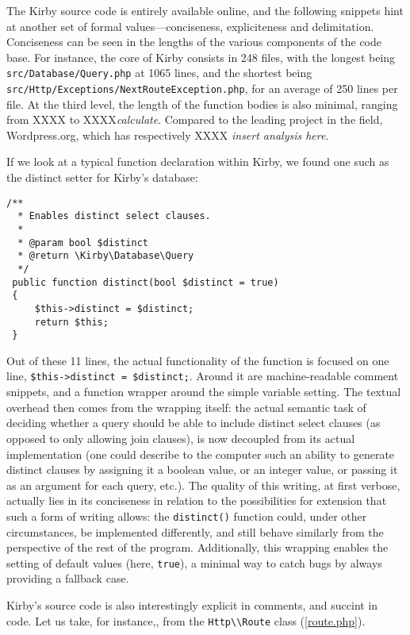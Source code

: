 The Kirby source code is entirely available online, and the following snippets hint at another set of formal values—conciseness, expliciteness and delimitation. Conciseness can be seen in the lengths of the various components of the code base. For instance, the core of Kirby consists in 248 files, with the longest being \lstinline{src/Database/Query.php} at 1065 lines, and the shortest being \lstinline{src/Http/Exceptions/NextRouteException.php}, for an average of 250 lines per file. At the third level, the length of the function bodies is also minimal, ranging from XXXX to XXXX\emph{calculate}. Compared to the leading project in the field, Wordpress.org, which has respectively XXXX \emph{insert analysis here}.

If we look at a typical function declaration within Kirby, we found one such as the distinct setter for Kirby's database:

\begin{lstlisting}[caption={Query.php}, label={query.php}, float, floatplacement=H]
  /**
  * Enables distinct select clauses.
  *
  * @param bool $distinct
  * @return \Kirby\Database\Query
  */
 public function distinct(bool $distinct = true)
 {
     $this->distinct = $distinct;
     return $this;
 }
\end{lstlisting}

Out of these 11 lines, the actual functionality of the function is focused on one line, \lstinline{$this->distinct = $distinct;}. Around it are machine-readable comment snippets, and a function wrapper around the simple variable setting. The textual overhead then comes from the wrapping itself: the actual semantic task of deciding whether a query should be able to include distinct select clauses (as opposed to only allowing join clauses), is now decoupled from its actual implementation (one could describe to the computer such an ability to generate distinct clauses by assigning it a boolean value, or an integer value, or passing it as an argument for each query, etc.). The quality of this writing, at first verbose, actually lies in its conciseness in relation to the possibilities for extension that such a form of writing allows: the \lstinline{distinct()} function could, under other circumstances, be implemented differently, and still behave similarly from the perspective of the rest of the program. Additionally, this wrapping enables the setting of default values (here, \lstinline{true}), a minimal way to catch bugs by always providing a fallback case.

Kirby's source code is also interestingly explicit in comments, and succint in code. Let us take, for instance,, from the \lstinline{Http\\Route} class (\ref{route.php}).

